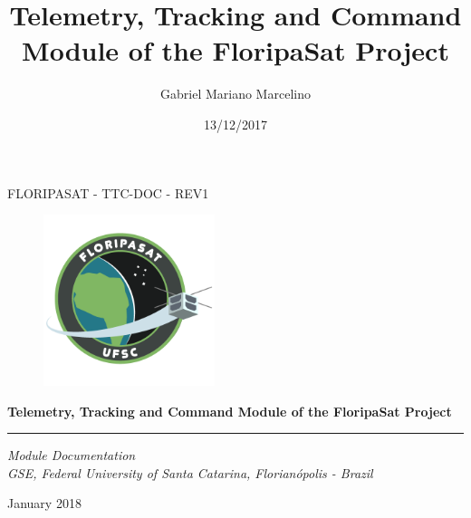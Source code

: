 \documentclass[12pt]{book}
\title{Telemetry, Tracking and Command Module of the FloripaSat Project}
\author{Gabriel Mariano Marcelino}
\date{13/12/2017}
\begin{document}
\begin{titlepage}

\thispagestyle{empty}

\begin{flushleft}
FLORIPASAT - TTC-DOC - REV1
\end{flushleft}

\begin{figure}[!ht]
	\begin{flushleft}
		\includegraphics[width=5cm]{figures/floripasat.png}
	\end{flushleft}
\end{figure}

\begin{flushleft}
\Huge{\textbf{Telemetry, Tracking and Command Module of the FloripaSat Project}}
\rule[0pt]{\textwidth}{5pt}
\end{flushleft}

\vspace{0.2cm}

\begin{flushleft}
\textit{Module Documentation} \\
\textit{GSE, Federal University of Santa Catarina, Florianópolis - Brazil}
\end{flushleft}

\vfill
\vfill

\begin{flushright}
January 2018
\end{flushright}

\setcounter{page}{1}

\end{titlepage}

\cleardoublepage

\end{document}
